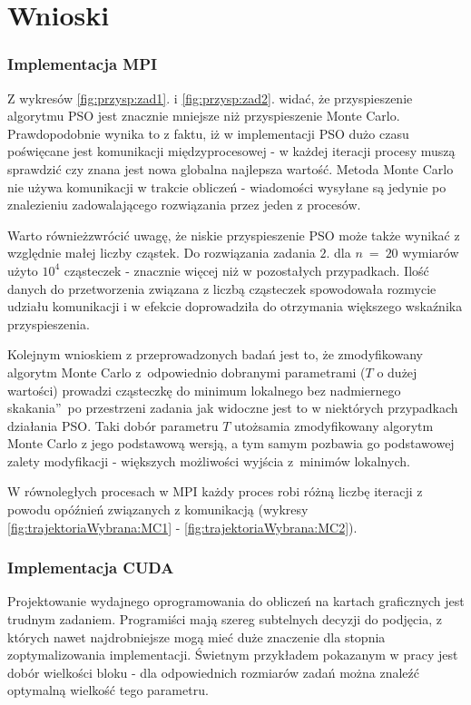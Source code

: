 \documentclass[11pt, a4paper, oneside]{article}
\begin{document}
\section{Wnioski} 
\subsubsection*{Implementacja MPI}
Z wykresów \ref{fig:przysp:zad1}. i \ref{fig:przysp:zad2}. widać, że przyspieszenie algorytmu PSO jest znacznie mniejsze niż przyspieszenie Monte Carlo. Prawdopodobnie wynika to z faktu, iż w implementacji PSO dużo czasu poświęcane jest komunikacji międzyprocesowej - w każdej iteracji procesy muszą sprawdzić czy znana jest nowa globalna najlepsza wartość. Metoda Monte Carlo nie używa komunikacji w trakcie obliczeń - wiadomości wysyłane są jedynie po znalezieniu zadowalającego rozwiązania przez jeden z procesów.

Warto równieżzwrócić uwagę, że niskie przyspieszenie PSO może także wynikać z względnie małej liczby cząstek. Do rozwiązania zadania $2$. dla $n \ = \ 20$ wymiarów użyto $10^{4}$ cząsteczek - znacznie więcej niż w pozostałych przypadkach. Ilość danych do przetworzenia związana z liczbą cząsteczek spowodowała rozmycie udziału komunikacji i w efekcie doprowadziła do otrzymania większego wskaźnika przyspieszenia.

Kolejnym wnioskiem z przeprowadzonych badań jest to, że zmodyfikowany algorytm Monte Carlo z~odpowiednio dobranymi parametrami ($T$ o dużej wartości) prowadzi cząsteczkę do minimum lokalnego bez nadmiernego \quotedblbase skakania\textquotedblright \ po przestrzeni zadania jak widoczne jest to w niektórych przypadkach działania PSO. Taki dobór parametru $T$ utożsamia zmodyfikowany algorytm Monte Carlo z jego podstawową wersją, a tym samym pozbawia go podstawowej zalety modyfikacji - większych możliwości wyjścia z~minimów lokalnych.

W równoległych procesach w MPI każdy proces robi różną liczbę iteracji z powodu opóźnień związanych z komunikacją (wykresy \ref{fig:trajektoriaWybrana:MC1} - \ref{fig:trajektoriaWybrana:MC2}).

\subsubsection*{Implementacja CUDA}
Projektowanie wydajnego oprogramowania do obliczeń na kartach graficznych jest trudnym zadaniem. Programiści mają szereg subtelnych decyzji do podjęcia, z których nawet najdrobniejsze mogą mieć duże znaczenie dla stopnia zoptymalizowania implementacji. Świetnym przykładem pokazanym w pracy jest dobór wielkości bloku - dla odpowiednich rozmiarów zadań można znaleźć optymalną wielkość tego parametru.
\end{document}
